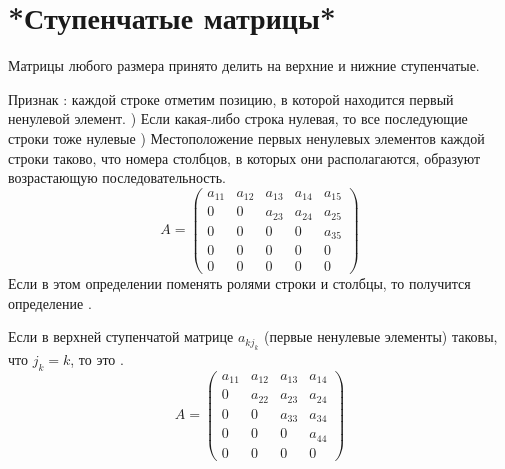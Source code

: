 \section{*Ступенчатые матрицы*}
Матрицы любого размера принято делить на верхние и нижние ступенчатые.
\begin{opred}Признак :
 каждой строке отметим позицию, в которой находится первый ненулевой элемент.
) Если какая-либо строка нулевая, то все последующие строки тоже нулевые
) Местоположение первых ненулевых элементов каждой строки таково, что номера столбцов, в которых они располагаются, образуют возрастающую последовательность.
$$
A=\begin{pmatrix}
a_{11} & a_{12} & a_{13} & a_{14} & a_{15} \\
0      & 0      & a_{23} & a_{24} & a_{25} \\
0      & 0      & 0      & 0      & a_{35} \\
0      & 0      & 0      & 0      & 0      \\
0      & 0      & 0      & 0      & 0
\end{pmatrix}
$$
Если в этом определении поменять ролями строки и столбцы, то получится определение .

Если в верхней ступенчатой матрице $a_{kj_k}$ (первые ненулевые элементы) таковы, что $j_k=k$, то это .
$$
A=\begin{pmatrix}
a_{11} & a_{12} & a_{13} & a_{14} \\
0      & a_{22} & a_{23} & a_{24} \\
0      & 0      & a_{33} & a_{34} \\
0      & 0      & 0      & a_{44} \\
0      & 0      & 0      & 0
\end{pmatrix}
$$
\end{opred}
